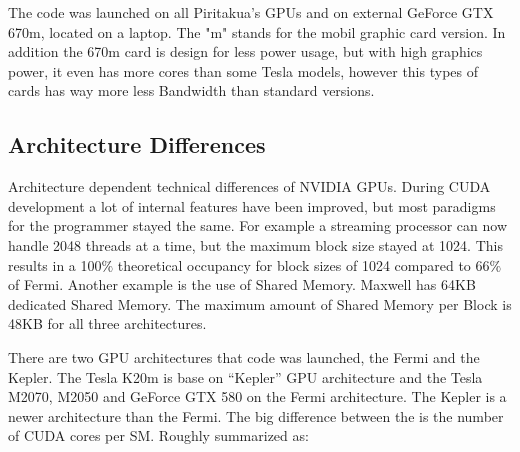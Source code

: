    The code was launched on all Piritakua's GPUs and on external GeForce GTX 670m, located on a laptop. The "m" stands for the mobil graphic card version. In addition the 670m card is design for less power usage, but with high graphics power, it even has more cores than some Tesla models, however this types of cards has way more less Bandwidth than standard versions.

  
\subsection{Architecture Differences}

  Architecture dependent technical differences of NVIDIA GPUs. During CUDA development a lot of internal features have been improved, but most paradigms for the programmer stayed the same. For example a streaming processor can now handle 2048 threads at a time, but the maximum block size stayed at 1024. This results in a 100$\%$ theoretical occupancy for block sizes of 1024 compared to 66$\%$ of Fermi. Another example is the use of Shared Memory. Maxwell has 64KB dedicated Shared Memory. The maximum amount of Shared Memory per Block is 48KB for all three architectures. \cite{hoermanngpu}
  
  There are two GPU architectures that code was launched, the Fermi and the Kepler. The Tesla K20m is base on ``Kepler'' GPU architecture and the Tesla M2070, M2050 and GeForce GTX 580 on the Fermi architecture. The Kepler is a newer architecture than the Fermi. The big difference between the is the number of CUDA cores per SM. Roughly summarized as:
  
